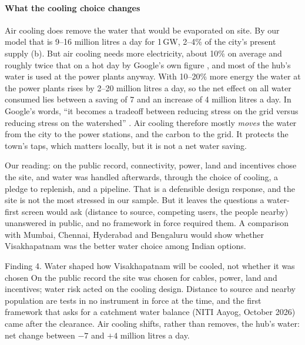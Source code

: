 \paragraph{What the cooling choice changes} Air cooling does remove the water that would be evaporated on site. By our
model that is 9--16 million litres a day for 1\,GW, 2--4\% of the city's present supply (b). But air cooling needs more
electricity, about 10\% on average and roughly twice that on a hot day by Google's own figure \citep{googlewater2026}, and
most of the hub's water is used at the power plants anyway. With 10--20\% more energy the water at the power plants rises by 2--20
million litres a day, so the net effect on all water consumed lies between a saving of 7 and an increase of 4 million litres a day. In
Google's words, ``it becomes a tradeoff between reducing stress on the grid versus reducing stress on the watershed''
\citep{googlewater2026}. Air cooling therefore mostly \emph{moves} the water from the city to the power stations, and the
carbon to the grid. It protects the town's taps, which matters locally, but it is not a net water saving.

\begin{reading}
Our reading: on the public record, connectivity, power, land and incentives chose the site, and water was handled afterwards,
through the choice of cooling, a pledge to replenish, and a pipeline. That is a defensible design response, and the site is not
the most stressed in our sample. But it leaves the questions a water-first screen would ask (distance to source, competing
users, the people nearby) unanswered in public, and no framework in force required them. A comparison with Mumbai, Chennai,
Hyderabad and Bengaluru would show whether Visakhapatnam was the better water choice among Indian options.
\end{reading}

\begin{finding}{Finding 4. Water shaped how Visakhapatnam will be cooled, not whether it was chosen}
On the public record the site was chosen for cables, power, land and incentives; water risk acted on the cooling design.
Distance to source and nearby population are tests in no instrument in force at the time, and the first framework that
asks for a catchment water balance (NITI Aayog, October 2026) came after the clearance. Air cooling shifts, rather than removes,
the hub's water: net change between $-7$ and $+4$ million litres a day.
\end{finding}
